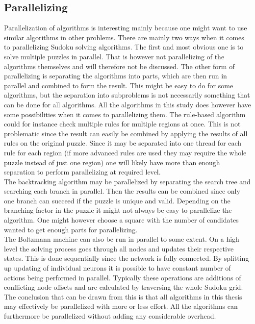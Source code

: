 \documentclass[a4paper,11pt]{kth-mag}
\begin{document}
\subsection{Parallelizing}
Parallelization of algorithms is interesting mainly because one might want to use similar algorithms in other problems.
There are mainly two ways when it comes to parallelizing Sudoku solving algorithms.
The first and most obvious one is to solve multiple puzzles in parallel.
That is however not parallelizing of the algorithms themselves and will therefore not be discussed.
The other form of parallelizing is separating the algorithms into parts, which are then run in parallel and combined to form the result.
This might be easy to do for some algorithms, but the separation into subproblems is not necessarily something that can be done for all algorithms.
All the algorithms in this study does however have some possibilities when it comes to parallelizing them.
The rule-based algorithm could for instance check multiple rules for multiple regions at once.
This is not problematic since the result can easily be combined by applying the results of all rules on the original puzzle.
Since it may be separated into one thread for each rule for each region (if more advanced rules are used they may require the whole puzzle instead of just one region) one will likely have more than enough separation to perform parallelizing at required level.
\\
The backtracking algorithm may be parallelized by separating the search tree and searching each branch in parallel.
Then the results can be combined since only one branch can succeed if the puzzle is unique and valid.
Depending on the branching factor in the puzzle it might not always be easy to parallelize the algorithm.
One might however choose a square with the number of candidates wanted to get enough parts for parallelizing.
\\
The Boltzmann machine can also be run in parallel to some extent.
On a high level the solving process goes through all nodes and updates their respective states.
This is done sequentially since the network is fully connected.
By splitting up updating of individual neurons it is possible to have constant number of actions being performed in parallel.
Typically these operations are additions of conflicting node offsets and are calculated by traversing the whole Sudoku grid.
\\
The conclusion that can be drawn from this is that all algorithms in this thesis may effectively be parallelized with more or less effort.
All the algorithms can furthermore be parallelized without adding any considerable overhead.
\end{document}
